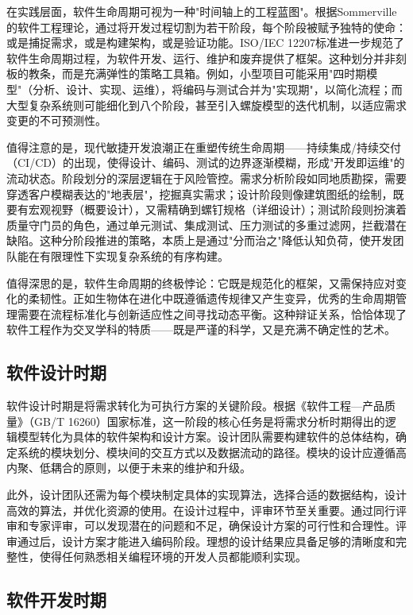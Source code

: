 在实践层面，软件生命周期可视为一种"时间轴上的工程蓝图"。根据Sommerville的软件工程理论，通过将开发过程切割为若干阶段，每个阶段被赋予独特的使命：或是捕捉需求，或是构建架构，或是验证功能。ISO/IEC 12207标准进一步规范了软件生命周期过程，为软件开发、运行、维护和废弃提供了框架。这种划分并非刻板的教条，而是充满弹性的策略工具箱。例如，小型项目可能采用"四时期模型"（分析、设计、实现、运维），将编码与测试合并为"实现期"，以简化流程；而大型复杂系统则可能细化到八个阶段，甚至引入螺旋模型的迭代机制，以适应需求变更的不可预测性。

值得注意的是，现代敏捷开发浪潮正在重塑传统生命周期——持续集成/持续交付（CI/CD）的出现，使得设计、编码、测试的边界逐渐模糊，形成"开发即运维"的流动状态。阶段划分的深层逻辑在于风险管控。需求分析阶段如同地质勘探，需要穿透客户模糊表达的"地表层"，挖掘真实需求；设计阶段则像建筑图纸的绘制，既要有宏观视野（概要设计），又需精确到螺钉规格（详细设计）；测试阶段则扮演着质量守门员的角色，通过单元测试、集成测试、压力测试的多重过滤网，拦截潜在缺陷。这种分阶段推进的策略，本质上是通过"分而治之"降低认知负荷，使开发团队能在有限理性下实现复杂系统的有序构建。

值得深思的是，软件生命周期的终极悖论：它既是规范化的框架，又需保持应对变化的柔韧性。正如生物体在进化中既遵循遗传规律又产生变异，优秀的生命周期管理需要在流程标准化与创新适应性之间寻找动态平衡。这种辩证关系，恰恰体现了软件工程作为交叉学科的特质——既是严谨的科学，又是充满不确定性的艺术。

\subsection{软件设计时期}

软件设计时期是将需求转化为可执行方案的关键阶段。根据《软件工程—产品质量》（GB/T 16260）国家标准，这一阶段的核心任务是将需求分析时期得出的逻辑模型转化为具体的软件架构和设计方案。设计团队需要构建软件的总体结构，确定系统的模块划分、模块间的交互方式以及数据流动的路径。模块的设计应遵循高内聚、低耦合的原则，以便于未来的维护和升级。

此外，设计团队还需为每个模块制定具体的实现算法，选择合适的数据结构，设计高效的算法，并优化资源的使用。在设计过程中，评审环节至关重要。通过同行评审和专家评审，可以发现潜在的问题和不足，确保设计方案的可行性和合理性。评审通过后，设计方案才能进入编码阶段。理想的设计结果应具备足够的清晰度和完整性，使得任何熟悉相关编程环境的开发人员都能顺利实现。

\subsection{软件开发时期}

